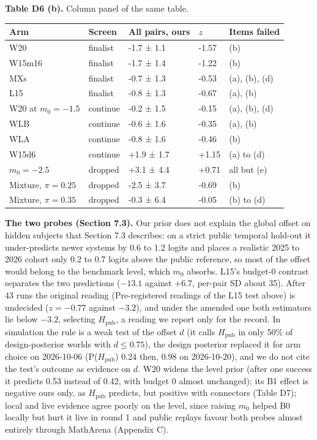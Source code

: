 \documentclass[
]{article}
\begin{document}
\textbf{Table D6 (b).} Column panel of the same table.

\begin{longtable}[]{@{}lllll@{}}
\toprule\noalign{}
Arm & Screen & All pairs, ours & \(z\) & Items failed \\
\midrule\noalign{}
\endhead
\bottomrule\noalign{}
\endlastfoot
W20 & finalist & -1.7 ± 1.1 & -1.57 & (b) \\
W15m16 & finalist & -1.7 ± 1.4 & -1.22 & (b) \\
MXs & finalist & -0.7 ± 1.3 & -0.53 & (a), (b), (d) \\
L15 & finalist & -0.8 ± 1.3 & -0.67 & (a), (b) \\
W20 at \(m_0 = -1.5\) & continue & -0.2 ± 1.5 & -0.15 & (a), (b), (d) \\
WLB & continue & -0.6 ± 1.6 & -0.35 & (a), (b) \\
WLA & continue & -0.8 ± 1.6 & -0.46 & (b) \\
W15d6 & continue & +1.9 ± 1.7 & +1.15 & (a) to (d) \\
\(m_0 = -2.5\) & dropped & +3.1 ± 4.4 & +0.71 & all but (e) \\
Mixture, \(\pi = 0.25\) & dropped & -2.5 ± 3.7 & -0.69 & (b) \\
Mixture, \(\pi = 0.35\) & dropped & -0.3 ± 6.4 & -0.05 & (b) to (d) \\
\end{longtable}

\textbf{The two probes (Section 7.3).} Our prior does not explain the
global offset on hidden subjects that Section 7.3 describes: on a strict
public temporal hold-out it under-predicts newer systems by 0.6 to 1.2
logits and places a realistic 2025 to 2026 cohort only 0.2 to 0.7 logits
above the public reference, so most of the offset would belong to the
benchmark level, which \(m_0\) absorbs. L15's budget-0 contrast
separates the two predictions (\(-13.1\) against \(+6.7\), per-pair SD
about 35). After 43 runs the original reading (Pre-registered readings
of the L15 test above) is undecided (\(z = -0.77\) against \(-3.2\)),
and under the amended one both estimators lie below \(-3.2\), selecting
\(H_{\mathrm{pub}}\), a reading we report only for the record. In
simulation the rule is a weak test of the offset \(d\) (it calls
\(H_{\mathrm{pub}}\) in only 50\% of design-posterior worlds with
\(d \le 0.75\)), the design posterior replaced it for arm choice on
2026-10-06 (P(\(H_{\mathrm{pub}}\)) 0.24 then, 0.98 on 2026-10-20), and
we do not cite the test's outcome as evidence on \(d\). W20 widens the
level prior (after one success it predicts 0.53 instead of 0.42, with
budget 0 almost unchanged); its B1 effect is negative ours only, as
\(H_{\mathrm{pub}}\) predicts, but positive with connectors (Table D7);
local and live evidence agree poorly on the level, since raising \(m_0\)
helped B0 locally but hurt it live in round 1 and public replays favour
both probes almost entirely through MathArena (Appendix C).
\end{document}

